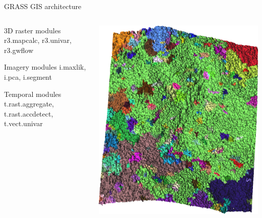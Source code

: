 \documentclass[xcolor={dvipsnames,usenames},beamer,aspectratio=169]{beamer}
\begin{document}
\begin{frame}{GRASS GIS architecture}

\begin{columns}
\begin{column}{0.4\textwidth}

\begin{block}{3D raster modules}
r3.mapcalc, r3.univar, r3.gwflow
\end{block}

\begin{block}{Imagery modules}
i.maxlik, i.pca, i.segment
\end{block}

\begin{block}{Temporal modules}
t.rast.aggregate, t.rast.accdetect, t.vect.univar
\end{block}

\end{column}
\begin{column}{0.35\textwidth}

\begin{center}
  \includegraphics[width=\textwidth]{grass/segements_from_3d_on_max}
\end{center}


\end{column}
\end{columns}

\end{frame}
\end{document}

